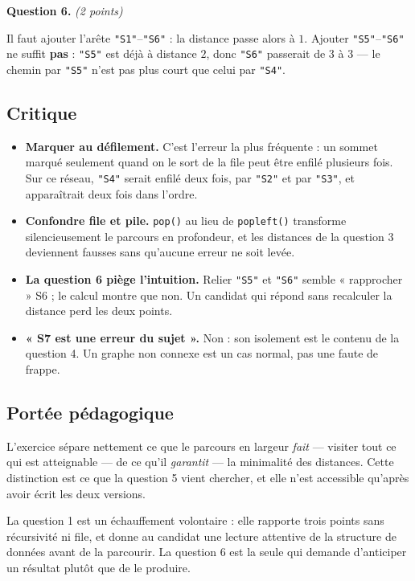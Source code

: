 \medskip
\textbf{Question 6.} \emph{(2 points)}

Il faut ajouter l'arête \lstinline{"S1"}--\lstinline{"S6"} : la distance passe
alors à $1$. Ajouter \lstinline{"S5"}--\lstinline{"S6"} ne suffit
\textbf{pas} : \lstinline{"S5"} est déjà à distance $2$, donc
\lstinline{"S6"} passerait de $3$ à $3$ — le chemin par \lstinline{"S5"} n'est
pas plus court que celui par \lstinline{"S4"}.

\subsection*{Critique}

\begin{itemize}
  \item \textbf{Marquer au défilement.} C'est l'erreur la plus fréquente : un
    sommet marqué seulement quand on le sort de la file peut être enfilé
    plusieurs fois. Sur ce réseau, \lstinline{"S4"} serait enfilé deux fois, par
    \lstinline{"S2"} et par \lstinline{"S3"}, et apparaîtrait deux fois dans
    l'ordre.
  \item \textbf{Confondre file et pile.} \lstinline{pop()} au lieu de
    \lstinline{popleft()} transforme silencieusement le parcours en profondeur,
    et les distances de la question 3 deviennent fausses sans qu'aucune erreur
    ne soit levée.
  \item \textbf{La question 6 piège l'intuition.} Relier \lstinline{"S5"} et
    \lstinline{"S6"} semble « rapprocher » S6 ; le calcul montre que non. Un
    candidat qui répond sans recalculer la distance perd les deux points.
  \item \textbf{« S7 est une erreur du sujet ».} Non : son isolement est le
    contenu de la question 4. Un graphe non connexe est un cas normal, pas une
    faute de frappe.
\end{itemize}

\subsection*{Portée pédagogique}

L'exercice sépare nettement ce que le parcours en largeur \emph{fait} — visiter
tout ce qui est atteignable — de ce qu'il \emph{garantit} — la minimalité des
distances. Cette distinction est ce que la question 5 vient chercher, et elle
n'est accessible qu'après avoir écrit les deux versions.

La question 1 est un échauffement volontaire : elle rapporte trois points sans
récursivité ni file, et donne au candidat une lecture attentive de la structure
de données avant de la parcourir. La question 6 est la seule qui demande
d'anticiper un résultat plutôt que de le produire.
